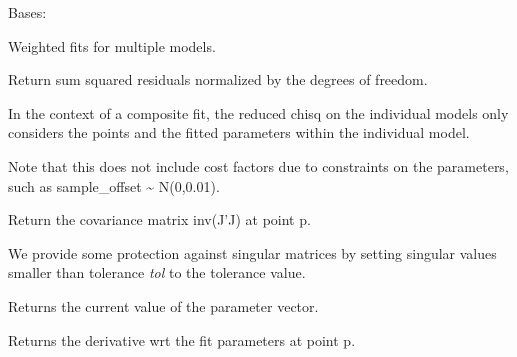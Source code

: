 \documentclass[letterpaper,10pt,english]{sphinxmanual}
\begin{document}
\begin{fulllineitems}
\label{api/fitproblem:refl1d.fitproblem.MultiFitProblem}
Bases: {\hyperref[api/fitproblem:refl1d.fitproblem.FitProblem]{}}

Weighted fits for multiple models.

\begin{fulllineitems}
\label{api/fitproblem:refl1d.fitproblem.MultiFitProblem.chisq}
Return sum squared residuals normalized by the degrees of freedom.

In the context of a composite fit, the reduced chisq on the individual
models only considers the points and the fitted parameters within
the individual model.

Note that this does not include cost factors due to constraints on
the parameters, such as sample\_offset \textasciitilde{} N(0,0.01).

\end{fulllineitems}


\begin{fulllineitems}
\label{api/fitproblem:refl1d.fitproblem.MultiFitProblem.cov}
Return the covariance matrix inv(J'J) at point p.

We provide some protection against singular matrices by setting
singular values smaller than tolerance \emph{tol} to the tolerance
value.

\end{fulllineitems}


\begin{fulllineitems}
\label{api/fitproblem:refl1d.fitproblem.MultiFitProblem.getp}
Returns the current value of the parameter vector.

\end{fulllineitems}


\begin{fulllineitems}
\label{api/fitproblem:refl1d.fitproblem.MultiFitProblem.jacobian}
Returns the derivative wrt the fit parameters at point p.


\end{fulllineitems}
\end{fulllineitems}
\end{document}
